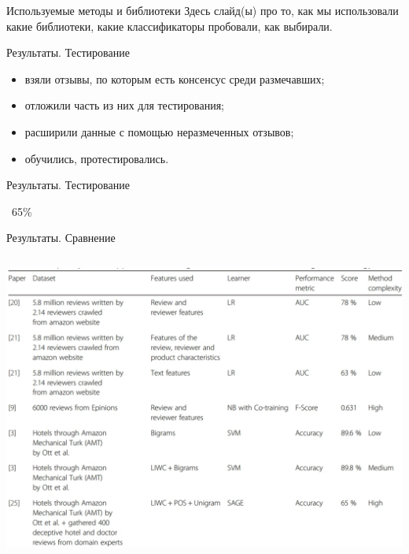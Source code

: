 \documentclass[mathserif,utf8,14pt]{beamer}
\begin{document}
\begin{frame}{Используемые методы и библиотеки}
    Здесь слайд(ы) про то, как мы использовали какие библиотеки,
    какие классификаторы пробовали, как выбирали.
\end{frame}

\begin{frame}{Результаты. Тестирование}
    \begin{itemize}
        \item взяли отзывы, по которым есть консенсус среди размечавших;
        \item отложили часть из них для тестирования;
        \item расширили данные с помощью неразмеченных отзывов;
        \item обучились, протестировались.
    \end{itemize}
\end{frame}

\begin{frame}{Результаты. Тестирование}
     \addtocounter{framenumber}{-1}
     \begin{center}
        \Huge ~65\%
     \end{center}
\end{frame}

\begin{frame}{Результаты. Сравнение}
     \addtocounter{framenumber}{-1}
     \begin{columns}
         \column{\dimexpr\paperwidth-10pt}
     \includegraphics[scale=0.3]{./converted_jpg.pdf}
     \end{columns}
\end{frame}
\end{document}
